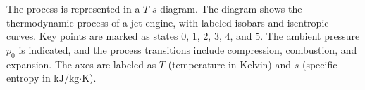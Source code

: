The process is represented in a \( T \)-\( s \) diagram. The diagram shows the thermodynamic process of a jet engine, with labeled isobars and isentropic curves. Key points are marked as states \( 0 \), \( 1 \), \( 2 \), \( 3 \), \( 4 \), and \( 5 \). The ambient pressure \( p_0 \) is indicated, and the process transitions include compression, combustion, and expansion. The axes are labeled as \( T \) (temperature in Kelvin) and \( s \) (specific entropy in \( \text{kJ}/\text{kg·K} \)).